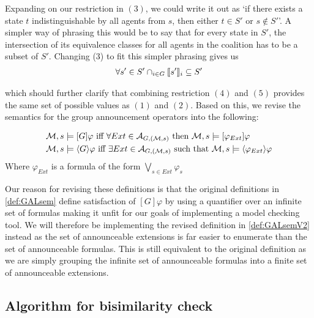 Expanding on our restriction in $(3)$, we could write it out as `if there exists a state $t$ indistinguishable by all agents from $s$, then either $t\in S'$ or $s\not\in S'$'. A simpler way of phrasing this would be to say that for every state in $S'$, the intersection of its equivalence classes for all agents in the coalition has to be a subset of $S'$. Changing (3) to fit this simpler phrasing gives us
\begin{align}
	\forall s'\in S' \cap_{i\in G}\llbracket s'\rrbracket_i\subseteq S'
\end{align}

which should further clarify that combining restriction $(4)$ and $(5)$ provides the same set of possible values as $(1)$ and $(2)$. Based on this, we revise the semantics for the group announcement operators into the following:

\begin{definition}
	\label{def:GALsemV2}
	\begin{align*}
		\mathcal{M},s & \models [G]\varphi \textrm{ iff }  \forall Ext\in\mathcal{A}_{G,(\mathcal{M},s)} \textrm{ then } \mathcal{M},s\models [\varphi_{Ext}]\varphi\\
		\mathcal{M},s & \models \langle G\rangle\varphi \textrm{ iff } \exists Ext\in\mathcal{A}_{G,(\mathcal{M},s)} \textrm{ such that } \mathcal{M},s\models \langle\varphi_{Ext}\rangle\varphi
	\end{align*}
	Where $\varphi_{Ext}$ is a formula of the form $\bigvee_{s\in Ext}\varphi_{s}$
\end{definition}

Our reason for revising these definitions is that the original definitions in \ref{def:GALsem} define satisfaction of $[G]\varphi$ by using a quantifier over an infinite set of formulas making it unfit for our goals of implementing a model checking tool. We will therefore be implementing the revised definition in \ref{def:GALsemV2} instead as the set of announceable extensions is far easier to enumerate than the set of announceable formulas. This is still equivalent to the original definition as we are simply grouping the infinite set of announceable formulas into a finite set of announceable extensions.


\subsection{Algorithm for bisimilarity check}

